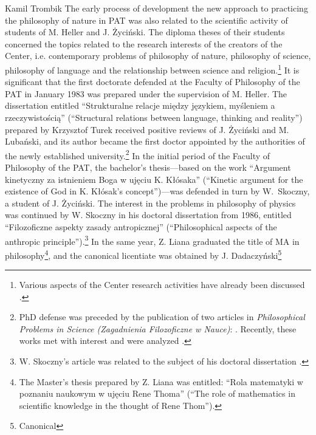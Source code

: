 \begin{artengenv}{Kamil Trombik}
The early process of development the new approach to practicing the philosophy of nature in PAT was also related to the
scientific activity of students of M. Heller and J. Życiński. The diploma theses of their students concerned the topics
related to the research interests of the creators of the Center, i.e. contemporary problems of philosophy of nature,
philosophy of science, philosophy of language and the relationship between science and religion.\footnote{Various
aspects of the Center research activities have already been discussed
\parencite[see e.g.][]{krauze_jedna_2008,maczka_badania_2012,skoczny_filozofia_2012}.
} It is significant that the first doctorate defended at the Faculty of Philosophy
of the PAT in January 1983 was prepared under the supervision of M. Heller. The dissertation entitled ``Strukturalne
relacje między językiem, myśleniem a rzeczywistością'' (``Structural relations between language, thinking and reality'')
prepared by Krzysztof Turek received positive reviews of J. Życiński and M. Lubański, and its author became the first
doctor appointed by the authorities of the newly established university.\footnote{PhD defense was preceded by the
publication of two articles in \textit{Philosophical Problems in Science (Zagadnienia Filozoficzne w Nauce)}:
\parencite{turek_filozoficzne_1978,turek_rozwazania_1981}.
Recently, these works met with interest and were analyzed
\parencite{krzanowski_towards_2016}.
} In the initial period of the Faculty of Philosophy of the PAT, the
bachelor's thesis---based on the work ``Argument kinetyczny za istnieniem Boga w ujęciu K. Kłósaka'' (``Kinetic argument for
the existence of God in K. Kłósak's concept'')---was defended in turn by W.~Skoczny, a student of J. Życiński. The interest in the
problems in philosophy of physics was continued by W. Skoczny in his doctoral dissertation from 1986, entitled
``Filozoficzne aspekty zasady antropicznej'' (``Philosophical aspects of the anthropic principle'').\footnote{W. Skoczny's
article was related to the subject of his doctoral dissertation
\parencite{skoczny_glowne_1985}.
} In the same
year, Z. Liana graduated the title of MA in philosophy\footnote{The Master's thesis prepared by Z. Liana was entitled:
``Rola matematyki w poznaniu naukowym w ujęciu Rene Thoma'' (``The role of mathematics in scientific knowledge in the
thought of Rene Thom'').}, and the canonical licentiate was obtained by J. Dadaczyński\footnote{Canonical
}
\end{artengenv}
